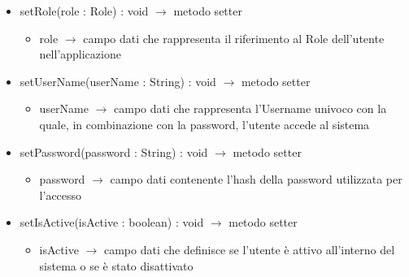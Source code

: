 \begin{description}
\begin{itemize}
	\item setRole(role : Role) : void $\rightarrow$ metodo setter\begin{itemize}
		\item role $\rightarrow$ campo dati che rappresenta il riferimento al Role dell'utente nell'applicazione
	\end{itemize}
	
	\item setUserName(userName : String) : void $\rightarrow$ metodo setter\begin{itemize}
		\item userName $\rightarrow$ campo dati che rappresenta l'Username univoco con la quale, in combinazione con la password, l'utente accede al sistema
	\end{itemize}
	
	\item setPassword(password : String) : void $\rightarrow$ metodo setter\begin{itemize}
		\item password $\rightarrow$ campo dati contenente l'hash della password utilizzata per l'accesso
	\end{itemize}
	
	\item setIsActive(isActive : boolean) : void $\rightarrow$ metodo setter\begin{itemize}
		\item isActive $\rightarrow$ campo dati che definisce se l'utente è attivo all'interno del sistema o se è stato disattivato
	\end{itemize}
	
\end{itemize}

\end{description}

\vspace{0.5cm}

